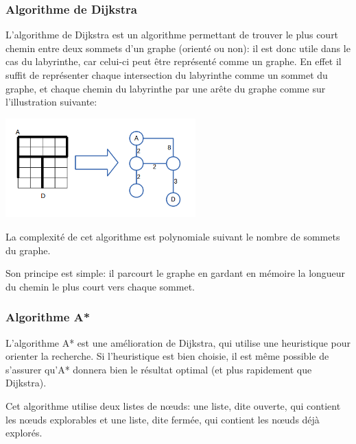   \subsubsection{Algorithme de Dijkstra}
    L'algorithme de Dijkstra est un algorithme permettant de trouver le plus
    court chemin entre deux sommets d'un graphe (orienté ou non): il est donc
    utile dans le cas du labyrinthe, car celui-ci peut être représenté comme un
    graphe. En effet il suffit de représenter chaque intersection du labyrinthe
    comme un sommet du graphe, et chaque chemin du labyrinthe par une arête du
    graphe comme sur l'illustration suivante:

    \begin{center}
      \includegraphics[width=0.55\textwidth]{../slides/jeux/GRO_graph1.png}
    \end{center}

    La complexité de cet algorithme est polynomiale suivant le nombre de sommets
    du graphe.

    Son principe est simple: il parcourt le graphe en gardant en mémoire la
    longueur du chemin le plus court vers chaque sommet.

  \subsubsection{Algorithme A*}
    L'algorithme A* est une amélioration de Dijkstra, qui utilise une heuristique
    pour orienter la recherche.
    Si l'heuristique est bien choisie, il est même possible de s'assurer qu'A*
    donnera bien le résultat optimal (et plus rapidement que Dijkstra).

    Cet algorithme utilise deux listes de nœuds: une liste, dite ouverte, qui
    contient les nœuds explorables et une liste, dite fermée, qui contient les
    nœuds déjà explorés.

